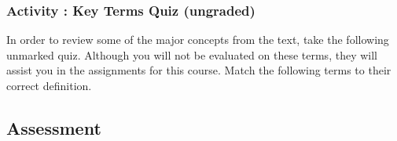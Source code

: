 \documentclass[
]{book}
\begin{document}
\begin{reflect}
\hypertarget{activity-key-terms-quiz-ungraded}{%
\subsubsection*{Activity : Key Terms Quiz (ungraded)}\label{activity-key-terms-quiz-ungraded}}

In order to review some of the major concepts from the text, take the following
unmarked quiz. Although you will not be evaluated on these terms, they will
assist you in the assignments for this course.
Match the following terms to their correct definition.
\end{reflect}

\hypertarget{assessment-4}{%
\subsection*{Assessment}\label{assessment-4}}
\end{document}
